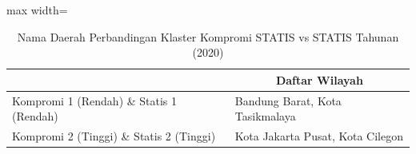 \begin{table}[H]
\centering
\caption{Nama Daerah Perbandingan Klaster Kompromi STATIS vs STATIS Tahunan (2020)} \label{tab:sample2comp_statis_name_2020}
\begin{adjustbox}{max width=\textwidth}
\begin{tabular}{|>{\centering\arraybackslash}p{4cm}|p{10cm}|}
\hline
\multicolumn{1}{|c|}{\textbf{Kategori}} & \multicolumn{1}{c|}{\textbf{Daftar Wilayah}} \\
\hline
Kompromi 1 (Rendah) \& Statis 1 (Rendah) & Bandung Barat, Kota Tasikmalaya \\
\hline
Kompromi 2 (Tinggi) \& Statis 2 (Tinggi) & Kota Jakarta Pusat, Kota Cilegon \\
\hline
\end{tabular}
\end{adjustbox}
\end{table}